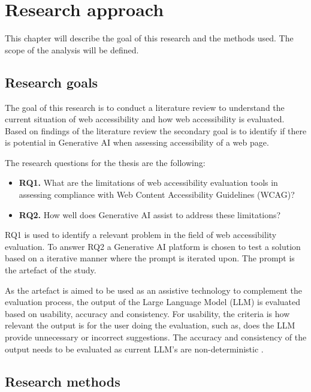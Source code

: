 \chapter{Research approach\label{methods}}

This chapter will describe the goal of this research and the methods used. The scope of the analysis will be defined.

\section{Research goals}

The goal of this research is to conduct a literature review to understand the current situation of web accessibility and how web accessibility is evaluated. Based on findings of the literature review the secondary goal is to identify if there is potential in Generative AI when assessing accessibility of a web page.

The research questions for the thesis are the following:

\begin{itemize}
    \item \textbf{RQ1.} What are the limitations of web accessibility evaluation tools in assessing compliance with Web Content Accessibility Guidelines (WCAG)?
    \item \textbf{RQ2.} How well does Generative AI assist to address these limitations?
\end{itemize}

RQ1 is used to identify a relevant problem in the field of web accessibility evaluation. To answer RQ2 a Generative AI platform is chosen to test a solution based on a iterative manner where the prompt is iterated upon. The prompt is the artefact of the study. 

As the artefact is aimed to be used as an assistive technology to complement the evaluation process, the output of the Large Language Model (LLM) is evaluated based on usability, accuracy and consistency. For usability, the criteria is how relevant the output is for the user doing the evaluation, such as, does the LLM provide unnecessary or incorrect suggestions. The accuracy and consistency of the output needs to be evaluated as current LLM's are non-deterministic \citep{ouyang2023llm}.


\section{Research methods}

